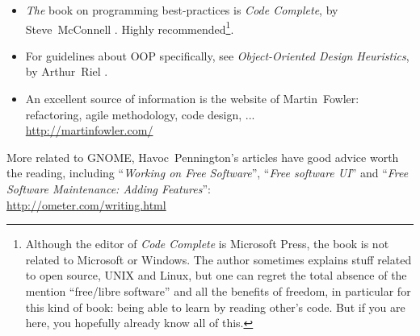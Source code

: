 \begin{itemize}
  \item \emph{The} book on programming best-practices is \emph{Code Complete}, by Steve~McConnell \cite{code-complete}. Highly recommended\footnote{Although the editor of \emph{Code Complete} is Microsoft Press, the book is not related to Microsoft or Windows. The author sometimes explains stuff related to open source, UNIX and Linux, but one can regret the total absence of the mention ``free/libre software'' and all the benefits of freedom, in particular for this kind of book: being able to learn by reading other's code. But if you are here, you hopefully already know all of this.}.

  \item For guidelines about OOP specifically, see \emph{Object-Oriented Design Heuristics}, by Arthur~Riel \cite{oop-book}.

  \item An excellent source of information is the website of Martin~Fowler: refactoring, agile methodology, code design, ...\\
  \url{http://martinfowler.com/}
\end{itemize}

More related to GNOME, Havoc~Pennington's articles have good advice worth the reading, including ``\emph{Working on Free Software}'', ``\emph{Free software UI}'' and ``\emph{Free Software Maintenance: Adding Features}'':\\
\url{http://ometer.com/writing.html}
